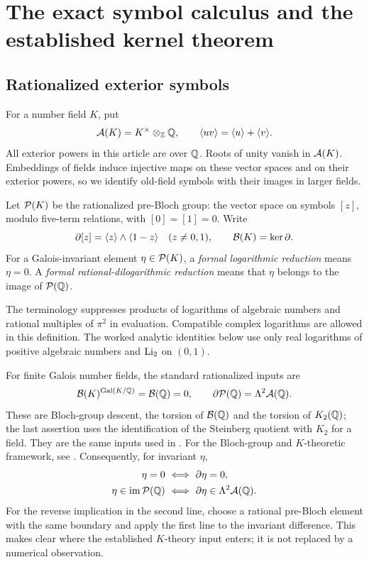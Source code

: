 \section{The exact symbol calculus and the established kernel theorem}
\label{sec:symbols}

\subsection{Rationalized exterior symbols}

For a number field $K$, put
\[
 \mathcal A(K)=K^\times\otimes_\mathbb Z\mathbb Q,
 \qquad \langle uv\rangle=\langle u\rangle+\langle v\rangle.
\]
All exterior powers in this article are over $\mathbb Q$. Roots of unity vanish
in $\mathcal A(K)$. Embeddings of fields induce injective maps on these vector
spaces and on their exterior powers, so we identify old-field symbols
with their images in larger fields.

\begin{definition}\label{def:formal}
Let $\mathcal P(K)$ be the rationalized pre-Bloch group: the vector space on
symbols $[z]$, modulo five-term relations, with $[0]=[1]=0$. Write
\[
 \partial[z]=\langle z\rangle\wedge\langle 1-z\rangle\quad(z\ne0,1),
 \qquad \mathcal B(K)=\ker\partial.
\]
For a Galois-invariant element $\eta\in\mathcal P(K)$, a
\emph{formal logarithmic reduction} means $\eta=0$. A
\emph{formal rational-dilogarithmic reduction} means that $\eta$ belongs
to the image of $\mathcal P(\mathbb Q)$.
\end{definition}

The terminology suppresses products of logarithms of algebraic numbers
and rational multiples of $\pi^2$ in evaluation. Compatible complex
logarithms are allowed in this definition. The worked analytic identities
below use only real logarithms of positive algebraic numbers and
$\operatorname{Li}_2$ on $(0,1)$.

For finite Galois number fields, the standard rationalized inputs are
\begin{equation}\label{eq:K-inputs}
 \mathcal B(K)^{\operatorname{Gal}(K/\mathbb Q)}=\mathcal B(\mathbb Q)=0,
 \qquad \partial\mathcal P(\mathbb Q)=\Lambda^2\mathcal A(\mathbb Q).
\end{equation}
These are Bloch-group descent, the torsion of $\mathcal B(\mathbb Q)$ and the torsion
of $K_2(\mathbb Q)$; the last assertion uses the identification of the
Steinberg quotient with $K_2$ for a field. They are the same inputs used
in \cite[\S7.2]{RZ}. For the Bloch-group and $K$-theoretic framework,
see \cite{ZagierDilog,CGZ}. Consequently, for invariant $\eta$,
\begin{align}
 \eta=0&\ \Longleftrightarrow\ \partial\eta=0,
 \label{eq:zero-detection}\\
 \eta\in\operatorname{im}\mathcal P(\mathbb Q)
 &\ \Longleftrightarrow\
 \partial\eta\in\Lambda^2\mathcal A(\mathbb Q).
 \label{eq:rational-detection}
\end{align}
For the reverse implication in the second line, choose a rational
pre-Bloch element with the same boundary and apply the first line to
the invariant difference. This makes clear where the established
$K$-theory input enters; it is not replaced by a numerical observation.

